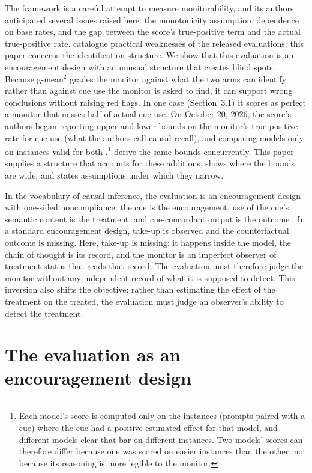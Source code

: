 \documentclass[11pt,a4paper]{article}
\begin{document}
The framework is a careful attempt to measure monitorability, and its authors anticipated several issues raised here: the monotonicity assumption, dependence on base rates, and the gap between the score’s true-positive term and the actual true-positive rate. \citet{dilgren2026evaluating} catalogue practical weaknesses of the released evaluations; this paper concerns the identification structure. We show that this evaluation is an encouragement design with an unusual structure that creates blind spots. Because g-mean$^2$ grades the monitor against what the two arms can identify rather than against cue use the monitor is asked to find, it can support wrong conclusions without raising red flags. In one case (Section~3.1) it scores as perfect a monitor that misses half of actual cue use. On October 20, 2026, the score’s authors began reporting upper and lower bounds on the monitor’s true-positive rate for cue use (what the authors call causal recall), and comparing models only on instances valid for both \citep*{guan2026beyond}.\footnote{Each model’s score is computed only on the instances (prompts paired with a cue) where the cue had a positive estimated effect for that model, and different models clear that bar on different instances. Two models’ scores can therefore differ because one was scored on easier instances than the other, not because its reasoning is more legible to the monitor.} \citet{fu2026learning} derive the same bounds concurrently. This paper supplies a structure that accounts for these additions, shows where the bounds are wide, and states assumptions under which they narrow.

In the vocabulary of causal inference, the evaluation is an encouragement design with one-sided noncompliance: the cue is the encouragement, use of the cue’s semantic content is the treatment, and cue-concordant output is the outcome \citep{angrist1996identification}. In a standard encouragement design, take-up is observed and the counterfactual outcome is missing. Here, take-up is missing: it happens inside the model, the chain of thought is its record, and the monitor is an imperfect observer of treatment status that reads that record. The evaluation must therefore judge the monitor without any independent record of what it is supposed to detect. This inversion also shifts the objective: rather than estimating the effect of the treatment on the treated, the evaluation must judge an observer’s ability to detect the treatment.

\section{The evaluation as an encouragement design}
\end{document}
